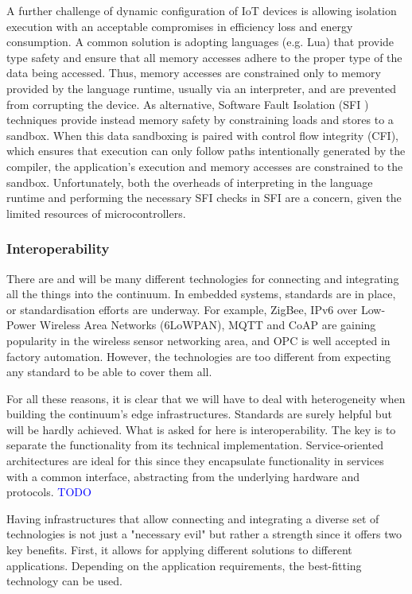 \documentclass{ieeeaccess}
\begin{document}
A further challenge of dynamic configuration of IoT devices is allowing isolation execution with an acceptable compromises in efficiency loss and energy consumption. A common solution is adopting languages (e.g. Lua) that provide type safety and ensure that all memory accesses adhere to the proper type of the data being accessed. Thus, memory accesses are constrained only to memory provided by the language runtime, usually via an interpreter, and are prevented from corrupting the device. 
As alternative, Software Fault Isolation (SFI \cite{sfi}) techniques provide instead memory safety by constraining loads and stores to a sandbox. When this data sandboxing is paired with control flow integrity (CFI), which ensures that execution can only follow paths intentionally generated by the compiler, the application's execution and memory accesses are constrained to the sandbox. Unfortunately, both the overheads of interpreting in the language runtime and performing the necessary SFI checks in SFI are a concern, given the limited resources of microcontrollers.

\subsubsection{Interoperability}

There are and will be many different technologies for connecting and integrating all the things into the continuum. In embedded systems, standards are in place, or standardisation efforts are underway. For example, ZigBee, IPv6 over Low-Power Wireless Area Networks (6LoWPAN), MQTT and CoAP \cite{mqtt-coap-amqp-http} are gaining popularity in the wireless sensor networking area, and OPC \cite{rest-opc} is well accepted in factory automation. However, the technologies are too different from expecting any standard to be able to cover them all.

For all these reasons, it is clear that we will have to deal with heterogeneity when building the continuum's edge infrastructures. Standards are surely helpful but will be hardly achieved. What is asked for here is interoperability. The key is to separate the functionality from its technical implementation. Service-oriented architectures are ideal for this since they encapsulate functionality in services with a common interface, abstracting from the underlying hardware and protocols. \textcolor{blue}{TODO}

Having infrastructures that allow connecting and integrating a diverse set of technologies is not just a "necessary evil" but rather a strength since it offers two key benefits. First, it allows for applying different solutions to different applications. Depending on the application requirements, the best-fitting technology can be used.
\end{document}
